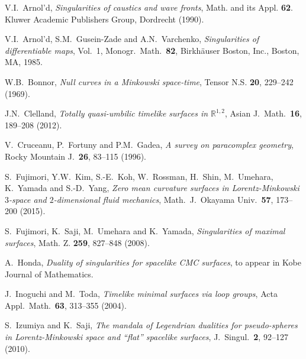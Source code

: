 \documentclass[11pt,reqno]{amsart}
\theoremstyle{plain} %
\theoremstyle{definition}
\begin{document}
\begin{thebibliography}{99}


V.I.~Arnol'd,
\emph{Singularities of caustics and wave fronts},
Math. and its Appl. {\bf 62}. Kluwer Academic Publishers Group, Dordrecht (1990).

V.I.~Arnol'd, S.M.~Gusein-Zade and A.N.~Varchenko, \emph{Singularities of differentiable maps}, Vol.\ 1, Monogr.\ Math.\ {\bf 82}, Birkh\"{a}user Boston, Inc., Boston, MA, 1985.


W.B.~Bonnor, 
\emph{Null curves in a Minkowski space-time}, Tensor N.S. {\bf 20}, 229--242 (1969).

  J.N.~Clelland, 
  \emph{Totally quasi-umbilic timelike surfaces in $\mathbb{R}^{1,2}$},
  Asian J.\ Math.\ {\bf 16}, 189--208 (2012).

V.~Cruceanu, P.~Fortuny and P.M.~Gadea,
\emph{A survey on paracomplex geometry}, Rocky Mountain J.\ {\bf 26}, 83--115 (1996).


  S.~Fujimori, Y.W.~Kim, S.-E.~Koh, W.~Rossman, H.~Shin, M.~Umehara,
  K.~Yamada and S.-D.~Yang,
  \emph{Zero mean curvature surfaces in {L}orentz-{M}inkowski $3$-space
             and $2$-dimensional fluid mechanics}, 
  Math.\ J.\ Okayama Univ.\ {\bf 57}, 173--200 (2015).

S.~Fujimori, K.~Saji, M.~Umehara and K.~Yamada,
\emph{Singularities of maximal surfaces}, Math. Z. {\bf 259}, 827--848 (2008).

A.~Honda,
\emph{Duality of singularities for spacelike CMC surfaces}, to appear in Kobe Journal of Mathematics.

J.~Inoguchi and M.~Toda,
\emph{Timelike minimal surfaces via loop groups}, Acta Appl.\ Math.\ {\bf 63}, 313--355 (2004).

S.~Izumiya and K.~Saji,
\emph{The mandala of Legendrian dualities for pseudo-spheres in Lorentz-Minkowski space and ``flat'' spacelike surfaces}, J.\ Singul.\ {\bf 2}, 92--127 (2010).


\end{thebibliography}
\end{document}
